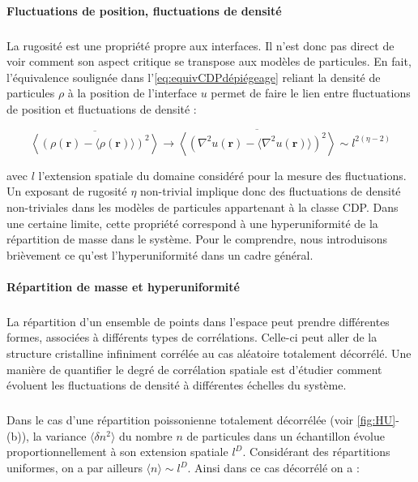 \paragraph{Fluctuations de position, fluctuations de densité}

\subparagraph{}La rugosité est une propriété propre aux interfaces. Il n'est donc pas direct de voir comment son aspect critique se transpose aux modèles de particules. En fait, l'équivalence soulignée dans l'\autoref{eq:equivCDPdépiégeage} reliant la densité de particules $\rho$ à la position de l'interface $u$ permet de faire le lien entre fluctuations de position et fluctuations de densité :

\begin{equation}
	\overline{\left\langle (\rho(\mathbf{r}) - \langle \rho(\mathbf{r}) \rangle)^2\right\rangle} \rightarrow \overline{\left\langle (\nabla^2 u(\mathbf{r}) - \langle \nabla^2 u(\mathbf{r}) \rangle)^2\right\rangle} \sim l^{2(\eta-2)}
	\label{eq:MappingHyperuni}
\end{equation}

\noindent avec $l$ l'extension spatiale du domaine considéré pour la mesure des fluctuations. Un exposant de rugosité $\eta$ non-trivial implique donc des fluctuations de densité non-triviales dans les modèles de particules appartenant à la classe CDP. Dans une certaine limite, cette propriété correspond à une hyperuniformité de la répartition de masse dans le système. Pour le comprendre, nous introduisons brièvement ce qu'est l'hyperuniformité dans un cadre général.

\paragraph{Répartition de masse et hyperuniformité}

\subparagraph{}La répartition d'un ensemble de points dans l'espace peut prendre différentes formes, associées à différents types de corrélations. Celle-ci peut aller de la structure cristalline infiniment corrélée au cas aléatoire totalement décorrélé. Une manière de quantifier le degré de corrélation spatiale est d'étudier comment évoluent les fluctuations de densité à différentes échelles du système. 

\subparagraph{}Dans le cas d'une répartition poissonienne totalement décorrélée (voir \autoref{fig:HU}-(b)), la variance $\langle \delta n^2 \rangle$ du nombre $n$ de particules dans un échantillon évolue proportionnellement à son extension spatiale $l^D$. Considérant des répartitions uniformes, on a par ailleurs $\langle n \rangle \sim l^D$. Ainsi dans ce cas décorrélé on a :

